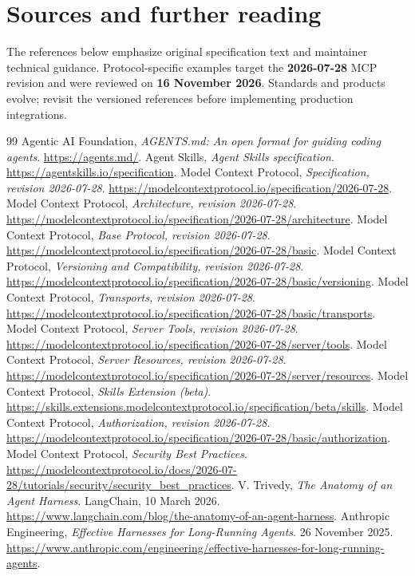 \documentclass[11pt,letterpaper]{article}
\begin{document}
\newpage
\section*{Sources and further reading}
\noindent The references below emphasize original specification text and maintainer technical guidance. Protocol-specific examples target the \textbf{2026-07-28} MCP revision and were reviewed on \textbf{16 November 2026}. Standards and products evolve; revisit the versioned references before implementing production integrations.
\begin{thebibliography}{99}\setlength{\itemsep}{4pt}
 Agentic AI Foundation, \emph{AGENTS.md: An open format for guiding coding agents}. \url{https://agents.md/}.
 Agent Skills, \emph{Agent Skills specification}. \url{https://agentskills.io/specification}.
 Model Context Protocol, \emph{Specification, revision 2026-07-28}. \url{https://modelcontextprotocol.io/specification/2026-07-28}.
 Model Context Protocol, \emph{Architecture, revision 2026-07-28}. \url{https://modelcontextprotocol.io/specification/2026-07-28/architecture}.
 Model Context Protocol, \emph{Base Protocol, revision 2026-07-28}. \url{https://modelcontextprotocol.io/specification/2026-07-28/basic}.
 Model Context Protocol, \emph{Versioning and Compatibility, revision 2026-07-28}. \url{https://modelcontextprotocol.io/specification/2026-07-28/basic/versioning}.
 Model Context Protocol, \emph{Transports, revision 2026-07-28}. \url{https://modelcontextprotocol.io/specification/2026-07-28/basic/transports}.
 Model Context Protocol, \emph{Server Tools, revision 2026-07-28}. \url{https://modelcontextprotocol.io/specification/2026-07-28/server/tools}.
 Model Context Protocol, \emph{Server Resources, revision 2026-07-28}. \url{https://modelcontextprotocol.io/specification/2026-07-28/server/resources}.
 Model Context Protocol, \emph{Skills Extension (beta)}. \url{https://skills.extensions.modelcontextprotocol.io/specification/beta/skills}.
 Model Context Protocol, \emph{Authorization, revision 2026-07-28}. \url{https://modelcontextprotocol.io/specification/2026-07-28/basic/authorization}.
 Model Context Protocol, \emph{Security Best Practices}. \url{https://modelcontextprotocol.io/docs/2026-07-28/tutorials/security/security_best_practices}.
 V. Trivedy, \emph{The Anatomy of an Agent Harness}. LangChain, 10 March 2026. \url{https://www.langchain.com/blog/the-anatomy-of-an-agent-harness}.
 Anthropic Engineering, \emph{Effective Harnesses for Long-Running Agents}. 26 November 2025. \url{https://www.anthropic.com/engineering/effective-harnesses-for-long-running-agents}.
\end{thebibliography}
\end{document}
